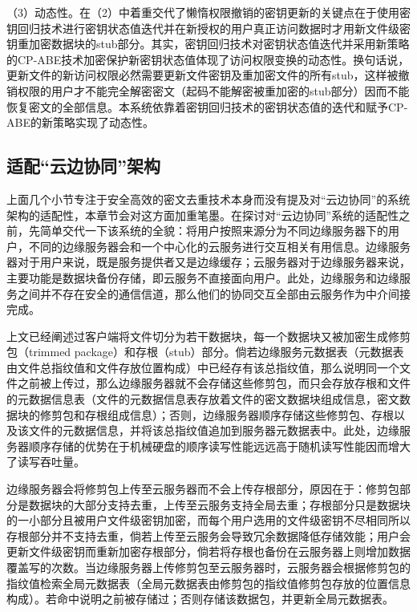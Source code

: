 \documentclass[promaster]{thesis-uestc}
\begin{document}
（3）动态性。在（2）中着重交代了懒惰权限撤销的密钥更新的关键点在于使用密钥回归技术进行密钥状态值迭代并在新授权的用户真正访问数据时才用新文件级密钥重加密数据块的stub部分。其实，密钥回归技术对密钥状态值迭代并采用新策略的CP-ABE技术加密保护新密钥状态值体现了访问权限变换的动态性。换句话说，更新文件的新访问权限必然需要更新文件密钥及重加密文件的所有stub，这样被撤销权限的用户才不能完全解密密文（起码不能解密被重加密的stub部分）因而不能恢复密文的全部信息。本系统依靠着密钥回归技术的密钥状态值的迭代和赋予CP-ABE的新策略实现了动态性。

\subsection{适配“云边协同”架构}\label{适配“云边协同”架构}
上面几个小节专注于安全高效的密文去重技术本身而没有提及对“云边协同”的系统架构的适配性，本章节会对这方面加重笔墨。在探讨对“云边协同”系统的适配性之前，先简单交代一下该系统的全貌：将用户按照来源分为不同边缘服务器下的用户，不同的边缘服务器会和一个中心化的云服务进行交互相关有用信息。边缘服务器对于用户来说，既是服务提供者又是边缘缓存；云服务器对于边缘服务器来说，主要功能是数据块备份存储，即云服务不直接面向用户。此处，边缘服务和边缘服务之间并不存在安全的通信信道，那么他们的协同交互全部由云服务作为中介间接完成。

上文已经阐述过客户端将文件切分为若干数据块，每一个数据块又被加密生成修剪包（trimmed package）和存根（stub）部分。倘若边缘服务元数据表（元数据表由文件总指纹值和文件存放位置构成）中已经存有该总指纹值，那么说明同一个文件之前被上传过，那么边缘服务器就不会存储这些修剪包，而只会存放存根和文件的元数据信息表（文件的元数据信息表存放着文件的密文数据块组成信息，密文数据块的修剪包和存根组成信息）；否则，边缘服务器顺序存储这些修剪包、存根以及该文件的元数据信息，并将该总指纹值追加到服务器元数据表中。此处，边缘服务器顺序存储的优势在于机械硬盘的顺序读写性能远远高于随机读写性能因而增大了读写吞吐量。

边缘服务器会将修剪包上传至云服务器而不会上传存根部分，原因在于：修剪包部分是数据块的大部分支持去重，上传至云服务支持全局去重；存根部分只是数据块的一小部分且被用户文件级密钥加密，而每个用户选用的文件级密钥不尽相同所以存根部分并不支持去重，倘若上传至云服务会导致冗余数据降低存储效能；用户会更新文件级密钥而重新加密存根部分，倘若将存根也备份在云服务器上则增加数据覆盖写的次数。当边缘服务器上传修剪包至云服务器时，云服务器会根据修剪包的指纹值检索全局元数据表（全局元数据表由修剪包的指纹值修剪包存放的位置信息构成）。若命中说明之前被存储过；否则存储该数据包，并更新全局元数据表。
\end{document}
